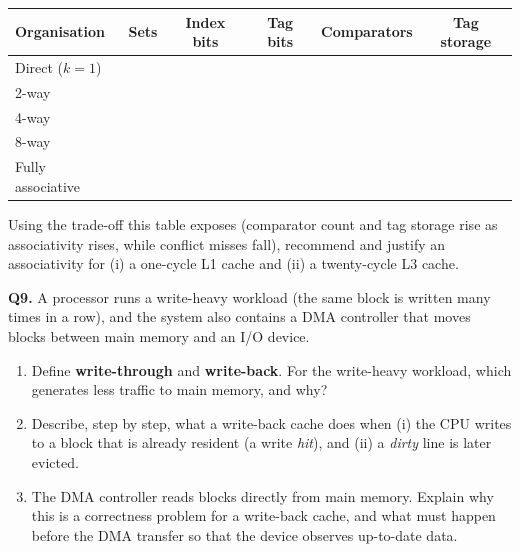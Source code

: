 \documentclass[11pt]{article}
\begin{document}
\begin{center}
\begin{tabular}{@{}lccccc@{}}
\toprule
\textbf{Organisation} & \textbf{Sets} & \textbf{Index bits} & \textbf{Tag bits} & \textbf{Comparators} & \textbf{Tag storage} \\
\midrule
Direct ($k{=}1$)      &  &  &  &  &  \\
2-way                  &  &  &  &  &  \\
4-way                  &  &  &  &  &  \\
8-way                  &  &  &  &  &  \\
Fully associative      &  &  &  &  &  \\
\bottomrule
\end{tabular}
\end{center}

Using the trade-off this table exposes (comparator count and tag storage rise as associativity rises, while conflict misses fall), recommend and justify an associativity for (i) a one-cycle L1 cache and (ii) a twenty-cycle L3 cache.

\textbf{Q9.} A processor runs a write-heavy workload (the same block is written many times in a row), and the system also contains a DMA controller that moves blocks between main memory and an I/O device.
\begin{enumerate}
  \item[(a)] Define \textbf{write-through} and \textbf{write-back}. For the write-heavy workload, which generates less traffic to main memory, and why?
  \item[(b)] Describe, step by step, what a write-back cache does when (i) the CPU writes to a block that is already resident (a write \emph{hit}), and (ii) a \emph{dirty} line is later evicted.
  \item[(c)] The DMA controller reads blocks directly from main memory. Explain why this is a correctness problem for a write-back cache, and what must happen before the DMA transfer so that the device observes up-to-date data.
\end{enumerate}
\end{document}
